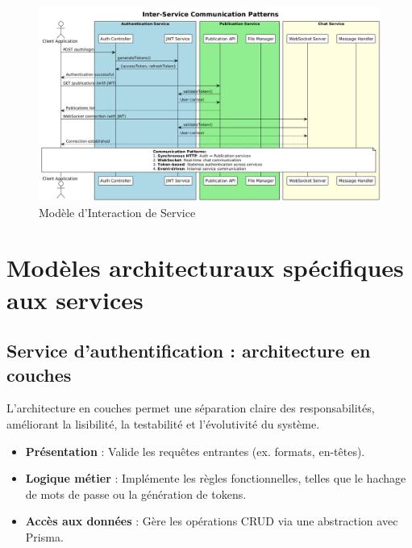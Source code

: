 \documentclass[12pt]{rapportPfe}
\begin{document}
\begin{figure}[htbp]
    \centering
    \includegraphics[width=1.1\textwidth]{diagrams/diagram1.png}
    \caption{Modèle d’Interaction de Service}
    \label{fig:diagram1}
\end{figure}

\newpage
\FloatBarrier

\section{Modèles architecturaux spécifiques aux services}

\subsection{Service d’authentification : architecture en couches}
L’architecture en couches permet une séparation claire des responsabilités, améliorant la lisibilité, la testabilité et l’évolutivité du système.

\begin{itemize}[label=--]
    \item \textbf{Présentation} : Valide les requêtes entrantes (ex. formats, en-têtes).
    \item \textbf{Logique métier} : Implémente les règles fonctionnelles, telles que le hachage de mots de passe ou la génération de tokens.
    \item \textbf{Accès aux données} : Gère les opérations CRUD via une abstraction avec Prisma.
\end{itemize}
\end{document}
